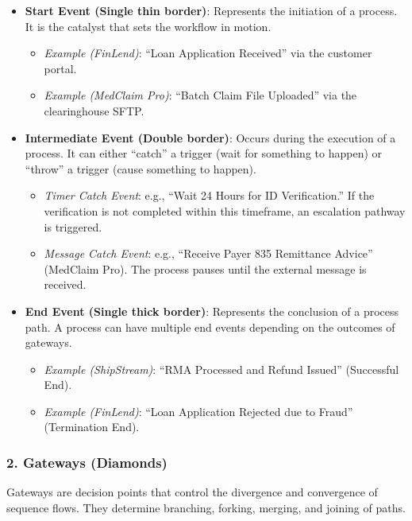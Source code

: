 \begin{itemize}
\tightlist
\item
  \textbf{Start Event (Single thin border)}: Represents the initiation
  of a process. It is the catalyst that sets the workflow in motion.

  \begin{itemize}
  \tightlist
  \item
    \emph{Example (FinLend)}: ``Loan Application Received'' via the
    customer portal.
  \item
    \emph{Example (MedClaim Pro)}: ``Batch Claim File Uploaded'' via the
    clearinghouse SFTP.
  \end{itemize}
\item
  \textbf{Intermediate Event (Double border)}: Occurs during the
  execution of a process. It can either ``catch'' a trigger (wait for
  something to happen) or ``throw'' a trigger (cause something to
  happen).

  \begin{itemize}
  \tightlist
  \item
    \emph{Timer Catch Event}: e.g., ``Wait 24 Hours for ID
    Verification.'' If the verification is not completed within this
    timeframe, an escalation pathway is triggered.
  \item
    \emph{Message Catch Event}: e.g., ``Receive Payer 835 Remittance
    Advice'' (MedClaim Pro). The process pauses until the external
    message is received.
  \end{itemize}
\item
  \textbf{End Event (Single thick border)}: Represents the conclusion of
  a process path. A process can have multiple end events depending on
  the outcomes of gateways.

  \begin{itemize}
  \tightlist
  \item
    \emph{Example (ShipStream)}: ``RMA Processed and Refund Issued''
    (Successful End).
  \item
    \emph{Example (FinLend)}: ``Loan Application Rejected due to Fraud''
    (Termination End).
  \end{itemize}
\end{itemize}

\subsubsection{2. Gateways (Diamonds)}\label{gateways-diamonds}

Gateways are decision points that control the divergence and convergence
of sequence flows. They determine branching, forking, merging, and
joining of paths.


